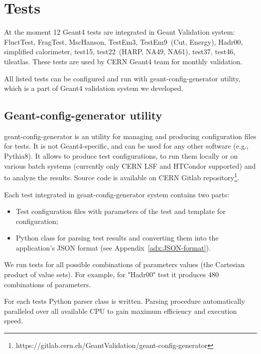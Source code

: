 \section{Tests}
\label{sec-tests}

At the moment 12 Geant4 tests are integrated in Geant Validation system: FluctTest, FragTest, MscHanson, TestEm3, TestEm9~(Cut, Energy), Hadr00, simplified calorimeter, test15, test22~(HARP, NA49, NA61), test37, test46, tileatlas. These tests are used by CERN Geant4 team for monthly validation.

All listed tests can be configured and run with geant-config-generator utility, which is a part of Geant4 validation system we developed.

\subsection{Geant-config-generator utility}
\label{sec-geant-config-generator}

geant-config-generator is an utility for managing and producing configuration files for tests. It is not Geant4-specific, and can be used for any other software (e.g., Pythia8). It allows to produce test configurations, to run them locally or on various batch systems (currently only CERN LSF and HTCondor supported) and to analyze the results. Source code is available on
CERN Gitlab repository\footnote{https://gitlab.cern.ch/GeantValidation/geant-config-generator}.

Each test integrated in geant-config-generator system contains two parts:

\begin{itemize}
	\item Test configuration files with parameters of the test and template for configuration;
	\item Python class for parsing test results and converting them into the application's JSON format (see Appendix~\ref{adx:JSON-format}).
\end{itemize}

We run tests for all possible combinations of parameters values (the Cartesian product of value sets). For example, for "Hadr00" test it produces 480 combinations of parameters.

For each tests Python parser class is written. Parsing procedure automatically paralleled over all available CPU to gain maximum efficiency and execution speed.


